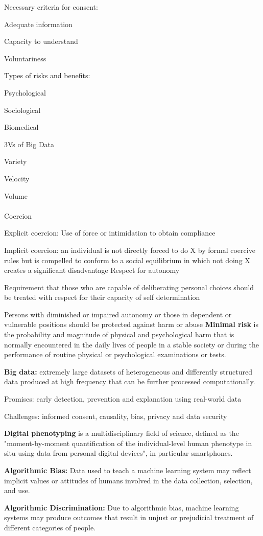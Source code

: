 \documentclass[12pt]{article}
\begin{document}
\par Necessary criteria for consent:
\ulb
\item Adequate information
\item Capacity to understand
\item Voluntariness
\ule
\mpe%
\par Types of risks and benefits:
\ulb
\item Psychological
\item Sociological
\item Biomedical
\ule
\mpe%
\par 3Vs of Big Data
\ulb
\item Variety
\item Velocity
\item Volume
\ule
\mpe
\\\\
Coercion
\ulb
\item Explicit coercion: Use of force or intimidation to obtain compliance
\item Implicit coercion: an individual is not directly forced to do X by formal coercive rules but is compelled to conform to a social equilibrium in which not doing X creates a significant disadvantage
\ule
Respect for autonomy
\ulb
\item Requirement that those who are capable of deliberating personal choices should be treated with respect for their capacity of self determination
\item Persons with diminished or impaired autonomy or those in dependent or vulnerable positions should be protected against harm or abuse
\ule
\textbf{Minimal risk} is the probability and magnitude of physical and psychological harm that is normally encountered in the daily lives of people in a stable society or during the performance of routine physical or psychological examinations or tests.
\par \textbf{Big data:} extremely large datasets of heterogeneous and differently structured data produced at high frequency that can be further processed computationally.
\ulb
\item Promises: early detection, prevention and explanation using real-world data
\item Challenges: informed consent, causality, bias, privacy and data security
\ule
\par \textbf{Digital phenotyping} is a multidisciplinary field of science, defined as the "moment-by-moment quantification of the individual-level human phenotype in situ using data from personal digital devices", in particular smartphones.
\par \textbf{ Algorithmic Bias:} Data used to teach a machine learning system may reflect implicit values or attitudes of humans involved in the data collection, selection, and use.
\par \textbf{Algorithmic Discrimination:} Due to algorithmic bias, machine learning systems may produce outcomes that result in unjust or prejudicial treatment of different categories of people.
\end{document}
